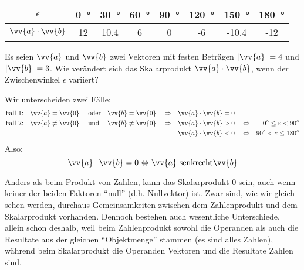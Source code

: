 \begin{margintable}[2.5cm]
    \centering
        \begin{tabular}{c|ccccccc}
        \toprule
            $\epsilon$   & \SI{0}{\degree} & \SI{30}{\degree} & \SI{60}{\degree} & \SI{90}{\degree} & \SI{120}{\degree} & \SI{150}{\degree} & \SI{180}{\degree} \\
            \midrule
            $\vv{a} \cdot \vv{b}$  & 12 & 10.4 & 6 & 0 & -6 & -10.4 & -12  \\
            \bottomrule
        \end{tabular}
\end{margintable}

\begin{example}
Es seien $\vv{a}$ und $\vv{b}$ zwei Vektoren mit festen Beträgen $|\vv{a}| = 4$ und $|\vv{b}| = 3$. Wie verändert sich das Skalarprodukt $\vv{a} \cdot \vv{b}$, wenn der Zwischenwinkel $\epsilon$ variiert?
\end{example}

\begin{Vorzeichendsp}
Wir unterscheiden zwei Fälle:\newline
\begin{align*}
\text{Fall 1:} & &  \vv{a} = \vv{0} & \quad \text{ oder} & \vv{b} = \vv{0} & \quad \Rightarrow & \vv{a} \cdot \vv{b} = 0  & & \\
\text{Fall 2:} & &  \vv{a} \neq \vv{0} & \quad \text{ und} & \vv{b} \neq \vv{0} & \quad \Rightarrow & \vv{a} \cdot \vv{b} > 0 & \quad \Leftrightarrow & \SI{0}{\degree} \leq \epsilon < \SI{90}{\degree} \\
 & &  & &  &  & \vv{a} \cdot \vv{b} < 0 & \quad \Leftrightarrow & \SI{90}{\degree} < \epsilon \leq \SI{180}{\degree} 
\end{align*}
Also:
\[ \vv{a} \cdot \vv{b} = 0 \Leftrightarrow \vv{a} \text{ senkrecht} \vv{b} \]
\end{Vorzeichendsp}
Anders als beim Produkt von Zahlen, kann das Skalarprodukt $0$ sein, auch wenn keiner der beiden Faktoren ``null'' (d.h. Nullvektor) ist. Zwar sind, wie wir gleich sehen werden, durchaus Gemeinsamkeiten zwischen dem Zahlenprodukt und dem Skalarprodukt vorhanden. Dennoch bestehen auch wesentliche Unterschiede, allein schon deshalb, weil beim Zahlenprodukt sowohl die Operanden als auch die Resultate aus der gleichen ``Objektmenge'' stammen (es sind alles Zahlen), während beim Skalarprodukt die Operanden Vektoren und die Resultate Zahlen sind.

